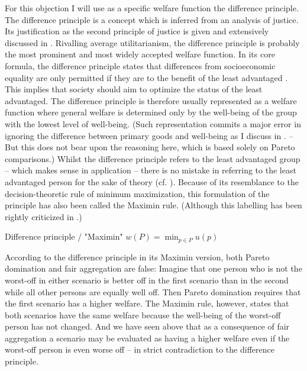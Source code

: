 For this objection I will use as a specific welfare function the difference principle. The difference principle is a concept which is inferred from an analysis of justice. Its justification as the second principle of justice is given and extensively discussed in \cite[pp.~3-183]{rawls_2005}. Rivalling average utilitarianism, the difference principle is probably the most prominent and most widely accepted welfare function. In its core formula, the difference principle states that differences from socioeconomic equality are only permitted if they are to the benefit of the least advantaged \cite[p.~302]{rawls_2005}. This implies that society should aim to optimize the status of the least advantaged. The difference principle is therefore usually represented as a welfare function where general welfare is determined only by the well-being of the group with the lowest level of well-being. (Such representation commits a major error in ignoring the difference between primary goods and well-being as I discuss in . – But this does not bear upon the reasoning here, which is based solely on Pareto comparisons.) Whilst the difference principle refers to the least advantaged group – which makes sense in application – there is no mistake in referring to the least advantaged person for the sake of theory (cf. \cite[p.~98]{rawls_2005}). Because of its resemblance to the decision-theoretic rule of minimum maximization, this formulation of the principle has also been called the Maximin rule. (Although this labelling has been rightly criticized in .) 

\begin{Definition}{Difference principle / "Maximin"}{} 
$w(P) = \min_{p\in P} u(p)$
\end{Definition}

According to the difference principle in its Maximin version, both Pa\-re\-to domination and fair aggregation are false: Imagine that one person who is not the worst-off in either scenario is better off in the first scenario than in the second while all other persons are equally well off. Then Pareto domination requires that the first scenario has a higher welfare. The Maximin rule, however, states that both scenarios have the same welfare because the well-being of the worst-off person has not changed. And we have seen above that as a consequence of fair aggregation a scenario may be evaluated as having a higher welfare even if the worst-off person is even worse off – in strict contradiction to the difference principle. 

